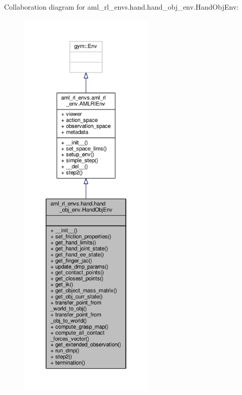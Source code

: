Collaboration diagram for aml\-\_\-rl\-\_\-envs.\-hand.\-hand\-\_\-obj\-\_\-env.\-Hand\-Obj\-Env\-:
\nopagebreak
\begin{figure}[H]
\begin{center}
\leavevmode
\includegraphics[height=550pt]{classaml__rl__envs_1_1hand_1_1hand__obj__env_1_1_hand_obj_env__coll__graph}
\end{center}
\end{figure}
